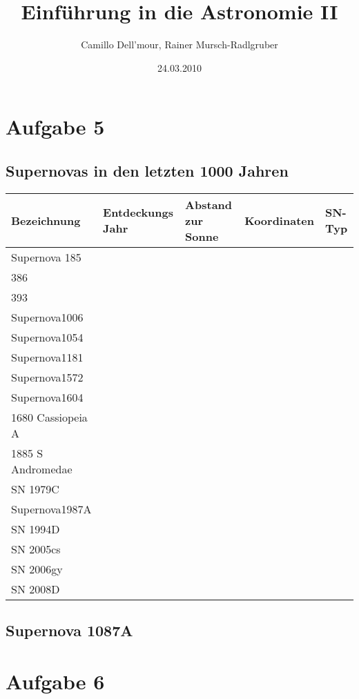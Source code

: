 \documentclass{scrartcl}
\title{Einführung in die Astronomie II}
\author{Camillo Dell'mour, Rainer Mursch-Radlgruber}
\date{24.03.2010}
\begin{document}
\maketitle
\section{Aufgabe 5}
\subsection{Supernovas in den letzten 1000 Jahren}
\begin{center}
	\begin{tabular}{ l | l | l | l | l |}
	\bf{Bezeichnung} & \bf{Entdeckungs Jahr} & \bf{Abstand zur Sonne} & \bf{Koordinaten} & \bf{SN-Typ} \\
	\hline
	Supernova 185 & & & & \\ \hline
	386 & & & & \\ \hline
	393 & & & & \\ \hline
	Supernova1006 & & & & \\ \hline
	Supernova1054 & & & & \\ \hline
	Supernova1181 & & & & \\ \hline
	Supernova1572 & & & & \\ \hline
	Supernova1604 & & & & \\ \hline
	1680 Cassiopeia A & & & & \\ \hline
	1885 S Andromedae & & & & \\ \hline
	SN 1979C & & & & \\ \hline
	Supernova1987A & & & & \\ \hline
	SN 1994D & & & & \\ \hline
	SN 2005cs & & & & \\ \hline
	SN 2006gy & & & & \\ \hline
	SN 2008D & & & & \\ \hline
	\hline
	\end{tabular}
\end{center}

\subsection{Supernova 1087A}

\section{Aufgabe 6}
\end{document}
